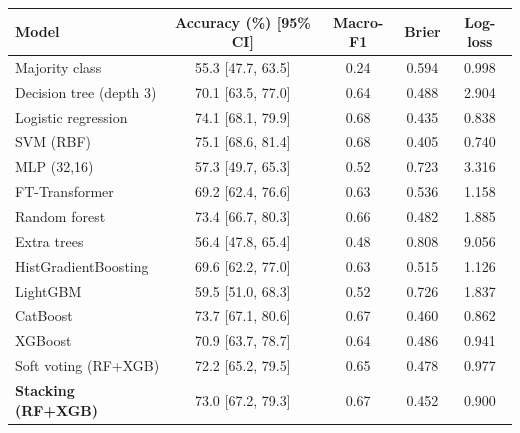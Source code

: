 \begin{tabular}{@{}lcccc@{}}
\toprule
Model & Accuracy (\%) [95\% CI] & Macro-F1 & Brier & Log-loss\\
\midrule
Majority class & 55.3 [47.7, 63.5] & 0.24 & 0.594 & 0.998\\\midrule
Decision tree (depth 3) & 70.1 [63.5, 77.0] & 0.64 & 0.488 & 2.904\\
Logistic regression & 74.1 [68.1, 79.9] & 0.68 & 0.435 & 0.838\\
SVM (RBF) & 75.1 [68.6, 81.4] & 0.68 & 0.405 & 0.740\\\midrule
MLP (32,16) & 57.3 [49.7, 65.3] & 0.52 & 0.723 & 3.316\\
FT-Transformer & 69.2 [62.4, 76.6] & 0.63 & 0.536 & 1.158\\
Random forest & 73.4 [66.7, 80.3] & 0.66 & 0.482 & 1.885\\
Extra trees & 56.4 [47.8, 65.4] & 0.48 & 0.808 & 9.056\\
HistGradientBoosting & 69.6 [62.2, 77.0] & 0.63 & 0.515 & 1.126\\
LightGBM & 59.5 [51.0, 68.3] & 0.52 & 0.726 & 1.837\\
CatBoost & 73.7 [67.1, 80.6] & 0.67 & 0.460 & 0.862\\\midrule
XGBoost & 70.9 [63.7, 78.7] & 0.64 & 0.486 & 0.941\\
Soft voting (RF+XGB) & 72.2 [65.2, 79.5] & 0.65 & 0.478 & 0.977\\
\textbf{Stacking (RF+XGB)} & 73.0 [67.2, 79.3] & 0.67 & 0.452 & 0.900\\
\bottomrule
\end{tabular}